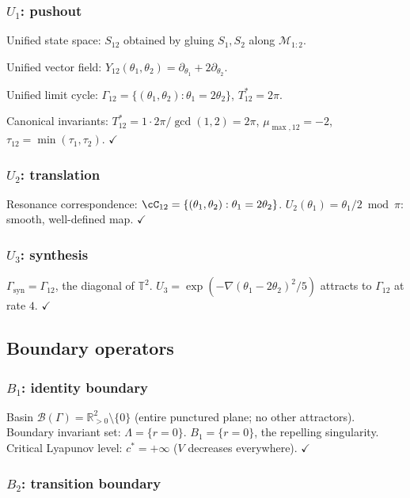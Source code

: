 \documentclass[12pt, oneside]{book}
\theoremstyle{plain}
\theoremstyle{definition}
\theoremstyle{remark}
\newcommand{\R}{\mathbb{R}}
\newcommand{\T}{\mathbb{T}}
\newcommand{\Orb}{\Gamma}
\newcommand{\cB}{\mathcal{B}}
\newcommand{\cM}{\mathcal{M}}
\begin{document}
\subsubsection{$U_1$: pushout}

Unified state space: $S_{12}$ obtained by gluing $S_1,S_2$ along
$\cM_{1:2}$.

Unified vector field:
$Y_{12}(\theta_1,\theta_2)=\partial_{\theta_1}+2\partial_{\theta_2}$.

Unified limit cycle:
$\Orb_{12}=\{(\theta_1,\theta_2):\theta_1=2\theta_2\}$, $T_{12}^*=2\pi$.

Canonical invariants:
$T_{12}^*=1\cdot 2\pi/\gcd(1,2)=2\pi$, $\mu_{\max,12}=-2$,
$\tau_{12}=\min(\tau_1,\tau_2)$. $\checkmark$

\subsubsection{$U_2$: translation}

Resonance correspondence: $\cC_{12}=\{(\theta_1,\theta_2):\theta_1=2\theta_2\}$.
$U_2(\theta_1)=\theta_1/2\bmod\pi$: smooth, well-defined map. $\checkmark$

\subsubsection{$U_3$: synthesis}

$\Orb_{\mathrm{syn}}=\Orb_{12}$, the diagonal of $\T^2$.
$U_3=\exp(-\nabla(\theta_1-2\theta_2)^2/5)$ attracts to
$\Orb_{12}$ at rate $4$. $\checkmark$

\subsection{Boundary operators}

\subsubsection{$B_1$: identity boundary}

Basin $\cB(\Orb)=\R^2_{>0}\setminus\{0\}$ (entire punctured plane;
no other attractors). Boundary invariant set: $\Lambda=\{r=0\}$.
$B_1=\{r=0\}$, the repelling singularity. Critical Lyapunov level:
$c^*=+\infty$ ($V$ decreases everywhere). $\checkmark$

\subsubsection{$B_2$: transition boundary}
\end{document}
